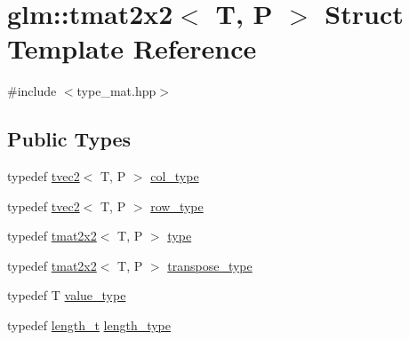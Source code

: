 \hypertarget{structglm_1_1tmat2x2}{}\section{glm\+::tmat2x2$<$ T, P $>$ Struct Template Reference}
\label{structglm_1_1tmat2x2}


{\ttfamily \#include $<$type\+\_\+mat.\+hpp$>$}

\subsection*{Public Types}
\begin{DoxyCompactItemize}
\item 
typedef \mbox{\hyperlink{structglm_1_1tvec2}{tvec2}}$<$ T, P $>$ \mbox{\hyperlink{structglm_1_1tmat2x2_a9e4690f52926b475b36ed5f6209f22f4}{col\+\_\+type}}
\item 
typedef \mbox{\hyperlink{structglm_1_1tvec2}{tvec2}}$<$ T, P $>$ \mbox{\hyperlink{structglm_1_1tmat2x2_ae47fdac58575c6c061ef9af82d342367}{row\+\_\+type}}
\item 
typedef \mbox{\hyperlink{structglm_1_1tmat2x2}{tmat2x2}}$<$ T, P $>$ \mbox{\hyperlink{structglm_1_1tmat2x2_ab558dcd4da9d21b6c5c5681ec536d6e1}{type}}
\item 
typedef \mbox{\hyperlink{structglm_1_1tmat2x2}{tmat2x2}}$<$ T, P $>$ \mbox{\hyperlink{structglm_1_1tmat2x2_af3fafee9ef3082f4a2aa80cc25ce5b36}{transpose\+\_\+type}}
\item 
typedef T \mbox{\hyperlink{structglm_1_1tmat2x2_aeac2c876456c92309d99f949824710b5}{value\+\_\+type}}
\item 
typedef \mbox{\hyperlink{namespaceglm_a090a0de2260835bee80e71a702492ed9}{length\+\_\+t}} \mbox{\hyperlink{structglm_1_1tmat2x2_a89bfd406715f8c3ae1c1f503d640fbb6}{length\+\_\+type}}
\end{DoxyCompactItemize}
